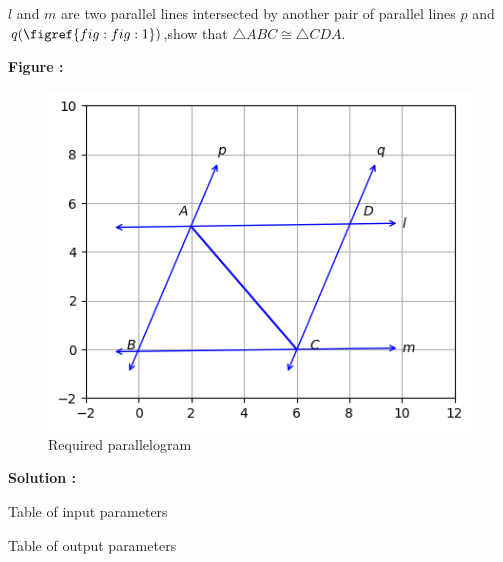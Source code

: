 $l$ and $m$ are two parallel lines intersected by another pair of parallel lines $p$ and $q (\figref{fig:fig:1})$,show that $\triangle ABC \cong \triangle CDA$.


\textbf{Figure :}
\begin{figure}[H]
    \centering
	\includegraphics[width=\columnwidth]{chapters/9/7/1/4/fig/em1.png}
    \caption{Required parallelogram}
    \label{fig:fig:1}
\end{figure}
\textbf{Solution :}\\
\begin{table}[h]
    \centering
	
    \caption{Table of input parameters}
    \label{tab:tab:1}
\end{table}
\begin{table}[h]
    \centering
    
    \caption{Table of output parameters}
    \label{tab:tab:2}
\end{table} 


